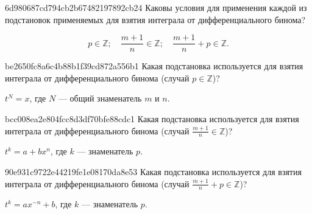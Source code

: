 \begin{note}{6d980687cd794cb2b67482197892cb24}
    Каковы условия для применения каждой из подстановок применяемых для взятия интеграла от дифференциального бинома?

    \begin{cloze}{1}
        \[
            p \in \mathbb Z; \quad
            \frac{m + 1}{n} \in \mathbb Z; \quad
            \frac{m + 1}{n} + p \in \mathbb Z.
        \]
    \end{cloze}
\end{note}

\begin{note}{be2650fc8a6c4b88b1f39cd872a556b1}
    Какая подстановка используется для взятия интеграла от дифференциального бинома (случай \({ p \in \mathbb Z }\))?

    \begin{cloze}{1}
        \({ t^{N} = x }\), где \({ N }\) --- общий знаменатель \({ m }\) и \({ n }\).
    \end{cloze}
\end{note}

\begin{note}{bcc008ea2e804fcc8d3df70bfe88cdc1}
    Какая подстановка используется для взятия интеграла от дифференциального бинома (случай \({ \frac{m + 1}{n} \in \mathbb Z }\))?

    \begin{cloze}{1}
        \({ t^{k} = a + bx^{n} }\), где \({ k }\) --- знаменатель \({ p }\).
    \end{cloze}
\end{note}

\begin{note}{90e931c9722e44219fe1e08170da8e53}
    Какая подстановка используется для взятия интеграла от дифференциального бинома (случай \({ \frac{m + 1}{n} + p \in \mathbb Z }\))?

    \begin{cloze}{1}
        \({ t^{k} = ax^{-n} + b }\), где \({ k }\) --- знаменатель \({ p }\).
    \end{cloze}
\end{note}

